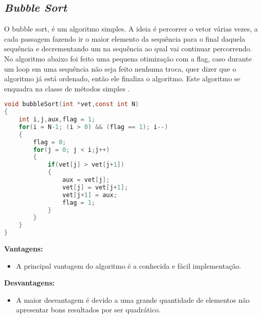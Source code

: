 \documentclass[
	12pt,				%
	oneside,			%
	a4paper,			%
	english,			%
	brazil,				%
	]{article}
\begin{document}
\subsection{\textit{Bubble Sort}}
O bubble sort, é um algoritmo simples. A ideia é percorrer o vetor várias vezes, a cada passagem fazendo ir o maior elemento da sequência para o final
daquela sequência e decrementando um na sequência ao qual vai continuar percorrendo. No algoritmo abaixo foi feito uma pequena otimização com a flag, caso
durante um loop em uma sequência não seja feito nenhuma troca, quer dizer que o algoritmo já está ordenado, então ele finaliza o algoritmo. Este algoritmo se 
enquadra na classe de métodos simples \cite{Bubble}.
\begin{lstlisting}[language=C, caption=Estrutura \textit{Bubble}]
void bubbleSort(int *vet,const int N)
{
	int i,j,aux,flag = 1;
	for(i = N-1; (i > 0) && (flag == 1); i--)
	{
		flag = 0;
		for(j = 0; j < i;j++)
		{
			if(vet[j] > vet[j+1])
			{
				aux = vet[j];
				vet[j] = vet[j+1];
				vet[j+1] = aux;
				flag = 1;
			}
		}
	}
}
\end{lstlisting}
\textbf{Vantagens:}
\begin{itemize}
 \item A principal vantagem do algoritmo é a conhecida e fácil implementação.
\end{itemize}
\textbf{Desvantagens:}
\begin{itemize}
 \item A maior desvantagem é devido a uma grande quantidade de elementos não apresentar bons resultados por ser quadrático.
\end{itemize}
\end{document}
